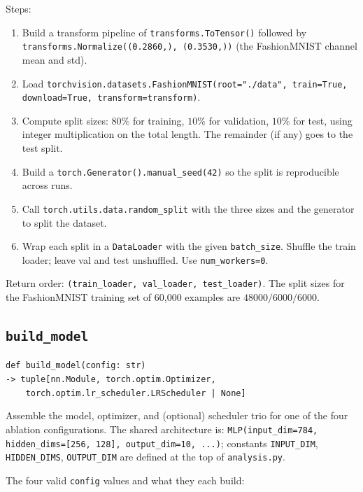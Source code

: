 \documentclass[11pt]{article}
\newcommand{\code}[1]{\texttt{\small #1}}
\begin{document}
\medskip\noindent
Steps:
\begin{enumerate}
    \item Build a transform pipeline of \code{transforms.ToTensor()} followed
          by \code{transforms.Normalize((0.2860,), (0.3530,))} (the
          FashionMNIST channel mean and std).
    \item Load \code{torchvision.datasets.FashionMNIST(root="./data",
          train=True, download=True, transform=transform)}.
    \item Compute split sizes: $80\%$ for training, $10\%$ for validation,
          $10\%$ for test, using integer multiplication on the total length.
          The remainder (if any) goes to the test split.
    \item Build a \code{torch.Generator().manual\_seed(42)} so the split is
          reproducible across runs.
    \item Call \code{torch.utils.data.random\_split} with the three sizes
          and the generator to split the dataset.
    \item Wrap each split in a \code{DataLoader} with the given
          \code{batch\_size}. Shuffle the train loader; leave val and test
          unshuffled. Use \code{num\_workers=0}.
\end{enumerate}

\noindent
Return order: \code{(train\_loader, val\_loader, test\_loader)}. The split
sizes for the FashionMNIST training set of 60,000 examples are
$48000 / 6000 / 6000$.

\subsection{\texttt{build\_model}}

\noindent
\code{def build\_model(config: str)}\\
\code{\hspace*{2em}-> tuple[nn.Module, torch.optim.Optimizer,}\\
\code{\hspace*{2em}~~~~torch.optim.lr\_scheduler.LRScheduler | None]}

\medskip\noindent
Assemble the model, optimizer, and (optional) scheduler trio for one of the
four ablation configurations. The shared architecture is:
\code{MLP(input\_dim=784, hidden\_dims=[256, 128], output\_dim=10, ...)};
constants \code{INPUT\_DIM}, \code{HIDDEN\_DIMS}, \code{OUTPUT\_DIM} are
defined at the top of \code{analysis.py}.

\medskip\noindent
The four valid \code{config} values and what they each build:
\end{document}
